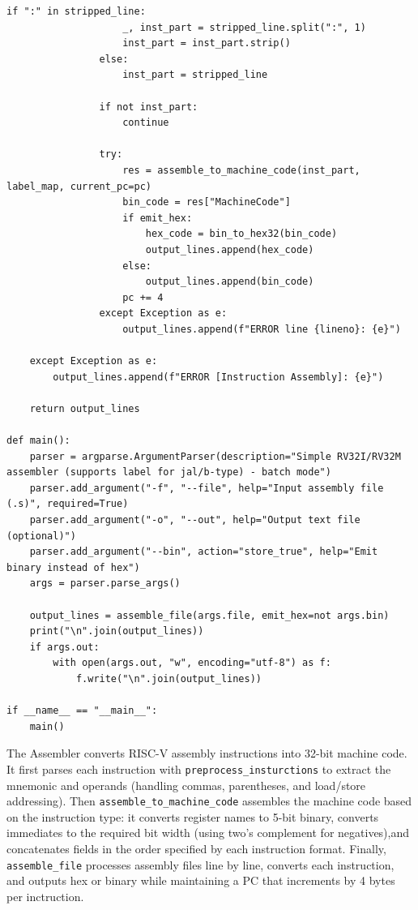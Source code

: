 \documentclass[11pt]{article}
\begin{document}
\begin{lstlisting}[style=mypython, caption=The Assembler Code, label=lst:assembler]
                if ":" in stripped_line:
                    _, inst_part = stripped_line.split(":", 1)
                    inst_part = inst_part.strip()
                else:
                    inst_part = stripped_line

                if not inst_part:
                    continue

                try:
                    res = assemble_to_machine_code(inst_part, label_map, current_pc=pc)
                    bin_code = res["MachineCode"]
                    if emit_hex:
                        hex_code = bin_to_hex32(bin_code)
                        output_lines.append(hex_code)  
                    else:
                        output_lines.append(bin_code)  
                    pc += 4  
                except Exception as e:
                    output_lines.append(f"ERROR line {lineno}: {e}")  

    except Exception as e:
        output_lines.append(f"ERROR [Instruction Assembly]: {e}")

    return output_lines

def main():
    parser = argparse.ArgumentParser(description="Simple RV32I/RV32M assembler (supports label for jal/b-type) - batch mode")
    parser.add_argument("-f", "--file", help="Input assembly file (.s)", required=True)
    parser.add_argument("-o", "--out", help="Output text file (optional)")
    parser.add_argument("--bin", action="store_true", help="Emit binary instead of hex")
    args = parser.parse_args()

    output_lines = assemble_file(args.file, emit_hex=not args.bin)
    print("\n".join(output_lines))
    if args.out:
        with open(args.out, "w", encoding="utf-8") as f:
            f.write("\n".join(output_lines))

if __name__ == "__main__":
    main()

\end{lstlisting}
The Assembler converts RISC-V assembly instructions into 32-bit machine code. It first parses each instruction with \texttt{preprocess\_insturctions} to extract the mnemonic and operands (handling commas, parentheses, and load/store addressing). 
Then \texttt{assemble\_to\_machine\_code} assembles the machine code based on the instruction type: it converts register names to 5-bit binary, converts immediates to the required bit width (using two's complement for negatives),and concatenates fields in the order specified by each instruction format.
Finally, \texttt{assemble\_file} processes assembly files line by line, converts each instruction, and outputs hex or binary while maintaining a PC that increments by 4 bytes per inctruction.
\end{document}
